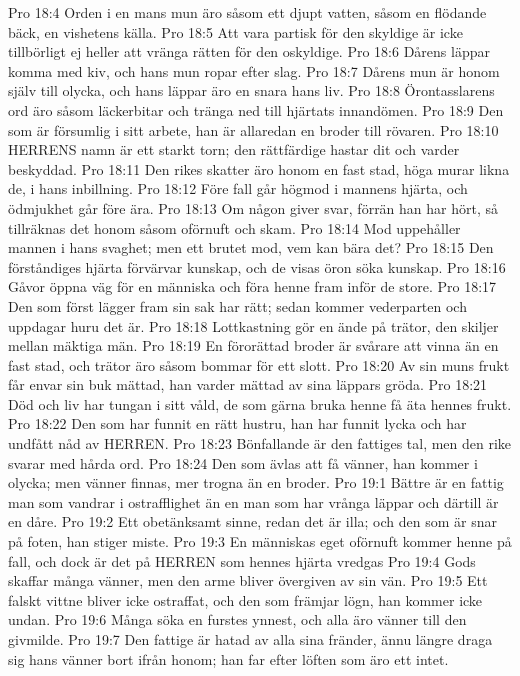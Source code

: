 Pro 18:4  Orden i en mans mun äro såsom ett djupt vatten, såsom en flödande bäck, en vishetens källa.
Pro 18:5  Att vara partisk för den skyldige är icke tillbörligt ej heller att vränga rätten för den oskyldige.
Pro 18:6  Dårens läppar komma med kiv, och hans mun ropar efter slag.
Pro 18:7  Dårens mun är honom själv till olycka, och hans läppar äro en snara hans liv.
Pro 18:8  Örontasslarens ord äro såsom läckerbitar och tränga ned till hjärtats innandömen.
Pro 18:9  Den som är försumlig i sitt arbete, han är allaredan en broder till rövaren.
Pro 18:10  HERRENS namn är ett starkt torn; den rättfärdige hastar dit och varder beskyddad.
Pro 18:11  Den rikes skatter äro honom en fast stad, höga murar likna de, i hans inbillning.
Pro 18:12  Före fall går högmod i mannens hjärta, och ödmjukhet går före ära.
Pro 18:13  Om någon giver svar, förrän han har hört, så tillräknas det honom såsom oförnuft och skam.
Pro 18:14  Mod uppehåller mannen i hans svaghet; men ett brutet mod, vem kan bära det?
Pro 18:15  Den förståndiges hjärta förvärvar kunskap, och de visas öron söka kunskap.
Pro 18:16  Gåvor öppna väg för en människa och föra henne fram inför de store.
Pro 18:17  Den som först lägger fram sin sak har rätt; sedan kommer vederparten och uppdagar huru det är.
Pro 18:18  Lottkastning gör en ände på trätor, den skiljer mellan mäktiga män.
Pro 18:19  En förorättad broder är svårare att vinna än en fast stad, och trätor äro såsom bommar för ett slott.
Pro 18:20  Av sin muns frukt får envar sin buk mättad, han varder mättad av sina läppars gröda.
Pro 18:21  Död och liv har tungan i sitt våld, de som gärna bruka henne få äta hennes frukt.
Pro 18:22  Den som har funnit en rätt hustru, han har funnit lycka och har undfått nåd av HERREN.
Pro 18:23  Bönfallande är den fattiges tal, men den rike svarar med hårda ord.
Pro 18:24  Den som ävlas att få vänner, han kommer i olycka; men vänner finnas, mer trogna än en broder.
Pro 19:1  Bättre är en fattig man som vandrar i ostrafflighet än en man som har vrånga läppar och därtill är en dåre.
Pro 19:2  Ett obetänksamt sinne, redan det är illa; och den som är snar på foten, han stiger miste.
Pro 19:3  En människas eget oförnuft kommer henne på fall, och dock är det på HERREN som hennes hjärta vredgas
Pro 19:4  Gods skaffar många vänner, men den arme bliver övergiven av sin vän.
Pro 19:5  Ett falskt vittne bliver icke ostraffat, och den som främjar lögn, han kommer icke undan.
Pro 19:6  Många söka en furstes ynnest, och alla äro vänner till den givmilde.
Pro 19:7  Den fattige är hatad av alla sina fränder, ännu längre draga sig hans vänner bort ifrån honom; han far efter löften som äro ett intet.
